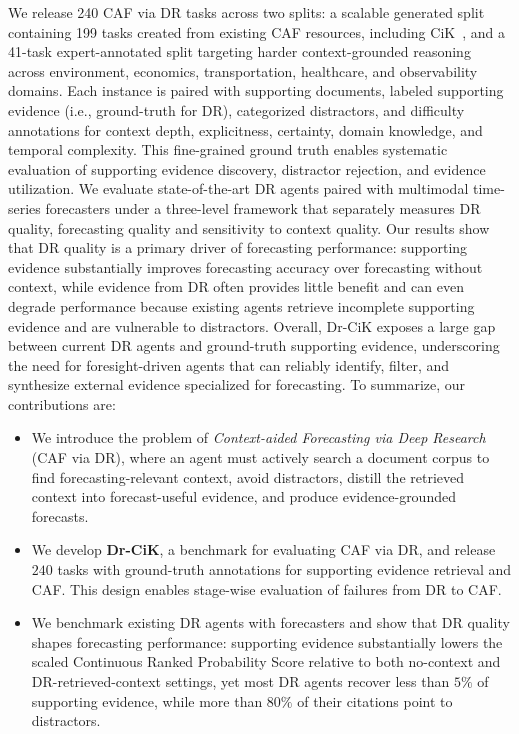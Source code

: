 \documentclass[]{servicenow}
\begin{document}
We release 240 CAF via DR tasks across two splits: a scalable generated split containing 199 tasks created from existing CAF resources, including CiK~\citep{williams2024context}, and a 41-task expert-annotated split targeting harder context-grounded reasoning across environment, economics, transportation, healthcare, and observability domains.
Each instance is paired with supporting documents, labeled supporting evidence (i.e., ground-truth for DR), categorized distractors, and difficulty annotations for context depth, explicitness, certainty, domain knowledge, and temporal complexity.
This fine-grained ground truth enables systematic evaluation of supporting evidence discovery, distractor rejection, and evidence utilization.
We evaluate state-of-the-art DR agents paired with multimodal time-series forecasters under a three-level framework that separately measures DR quality, forecasting quality and sensitivity to context quality. Our results show that DR quality is a primary driver of forecasting performance: supporting evidence substantially improves forecasting accuracy over forecasting without context, while evidence from DR often provides little benefit and can even degrade performance because existing agents retrieve incomplete supporting evidence and are vulnerable to distractors. Overall, Dr-CiK exposes a large gap between current DR agents and ground-truth supporting evidence, underscoring the need for foresight-driven agents that can reliably identify, filter, and synthesize external evidence specialized for forecasting.
To summarize, our contributions are:
\begin{itemize}[leftmargin=*, itemsep=0.2em, topsep=0.2em, parsep=0pt, partopsep=0pt]
\item We introduce the problem of \emph{Context-aided Forecasting via Deep Research} (CAF via DR), where an agent must actively search a document corpus to find forecasting-relevant context, avoid distractors, distill the retrieved context into forecast-useful evidence, and produce evidence-grounded forecasts.
\item We develop \textbf{Dr-CiK}, a benchmark for evaluating CAF via DR, and release $240$ tasks with ground-truth annotations for supporting evidence retrieval and CAF. This design enables stage-wise evaluation of failures from DR to CAF.
\item We benchmark existing DR agents with forecasters and show that DR quality shapes forecasting performance: supporting evidence substantially lowers the scaled Continuous Ranked Probability Score relative to both no-context and DR-retrieved-context settings, yet most DR agents recover less than $5\%$ of supporting evidence, while more than $80\%$ of their citations point to distractors.
\end{itemize}
\end{document}
